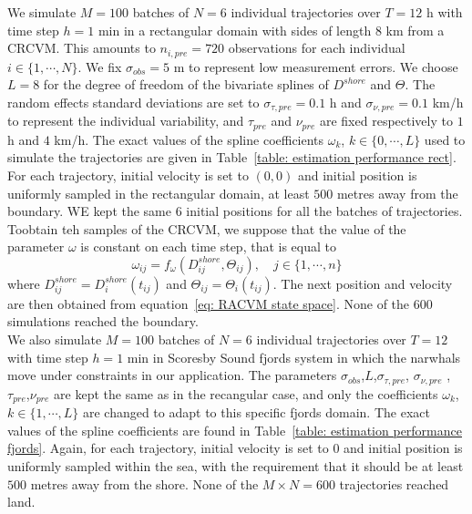 \documentclass[11pt]{article}
\newcommand {\1}{\mathbb{1}}
\begin{document}
We simulate $M=100$ batches of $N=6$ individual trajectories over $T=12$ h with time step $h=1$ min in a rectangular domain with sides of length $8$ km from a CRCVM. This amounts to $n_{i,pre}=720$ observations for each individual $i \in \{1,\cdots,N\}$. We fix $\sigma_{obs}=5$ m to represent low measurement errors. 
We choose $L=8$ for the degree of freedom of the bivariate splines of $D^{shore}$ and $\Theta$. The random effects standard deviations are set to $\sigma_{\tau,pre}=0.1$ h and $\sigma_{\nu,pre}=0.1$ km/h to represent the individual variability, and $\tau_{pre}$ and $\nu_{pre}$ are fixed respectively to $1$ h and $4$ km/h. The exact values of the spline coefficients $\omega_k$, $k \in \{0,\cdots,L\}$ used to simulate the trajectories are given in Table~\ref{table: estimation performance rect}. For each trajectory, initial velocity is set to $(0,0)$ and initial position is uniformly sampled in the rectangular domain, at least $500$ metres away from the boundary. WE kept the same $6$ initial positions for all the batches of trajectories. Toobtain teh samples of the CRCVM, we suppose that the value of the parameter $\omega$ is constant on each time step, that is equal to 
\begin{equation}
	\omega_{ij}=f_{\omega}(D^{shore}_{ij},\Theta_{ij}), \quad j  \in \{1,\cdots,n\}
\end{equation}
where $D^{shore}_{ij}=D^{shore}_i(t_{ij})$ and $\Theta_{ij}=\Theta_i(t_{ij})$. The next position and velocity are then obtained from equation~\ref{eq: RACVM state space}. None of the $600$ simulations reached the boundary. \\


We also simulate $M=100$ batches of $N=6$ individual trajectories over $T=12$ with time step $h=1$ min in Scoresby Sound fjords system in which the narwhals move under constraints in our application. The parameters $\sigma_{obs}$,$L$,$\sigma_{\tau,pre}$,  $\sigma_{\nu,pre}$ , $\tau_{pre}$,$\nu_{pre}$ are kept the same as in the recangular case, and only the coefficients $\omega_k$, $k \in \{1,\cdots,L\}$ are changed to adapt to this specific fjords domain. The exact values of the spline coefficients are found in Table~\ref{table: estimation performance fjords}.
Again, for each trajectory, initial velocity is set to $0$ and initial position is uniformly sampled within the sea, with the requirement that it should be at least $500$ metres away from the shore.  None of the $M\times N=600$ trajectories reached land. 

\end{document}
